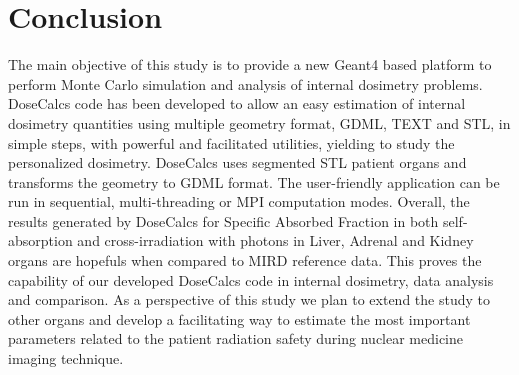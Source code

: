 \documentclass[letterpaper,12pt]{article}
\begin{document}

\section{Conclusion}

The main objective of this study is to provide a new Geant4 based platform to perform Monte Carlo simulation and analysis of internal dosimetry problems.
DoseCalcs code has been developed to allow an easy estimation of internal dosimetry quantities using multiple geometry format, GDML, TEXT and STL, in simple steps, with powerful and facilitated utilities, yielding to study the personalized dosimetry. DoseCalcs uses segmented STL patient organs and transforms the geometry to GDML format. The user-friendly application can be run in sequential, multi-threading or MPI computation modes. Overall, the results generated by DoseCalcs for Specific Absorbed Fraction in both self-absorption and cross-irradiation with photons in Liver, Adrenal and Kidney organs are hopefuls when compared to MIRD reference data. This proves the capability of our developed DoseCalcs code in internal dosimetry, data analysis and comparison. As a perspective of this study we plan to extend the study to other organs and develop a facilitating way to estimate the most important parameters related to the patient radiation safety during nuclear medicine imaging technique.
\end{document}
